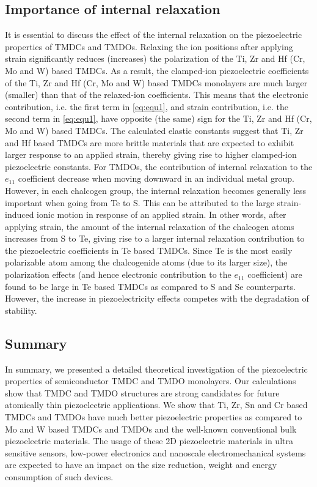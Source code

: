 \subsection{Importance of internal relaxation}

It is  essential to discuss the effect of the internal relaxation on the piezoelectric properties of TMDCs and TMDOs. Relaxing the ion positions after applying strain significantly reduces (increases) the polarization of the  Ti, Zr and Hf (Cr, Mo and W) based TMDCs. As a result, the clamped-ion piezoelectric coefficients of the Ti, Zr and Hf (Cr, Mo and W) based TMDCs monolayers are much larger (smaller) than that of the relaxed-ion coefficients. This means that the electronic contribution, i.e. the first term in \autoref{eq:equ1}, and strain contribution, i.e. the second term in \autoref{eq:equ1}, have opposite (the same) sign for the  Ti, Zr and Hf (Cr, Mo and W) based TMDCs.  The calculated elastic constants suggest that Ti, Zr and Hf based TMDCs are more brittle materials that are expected to exhibit larger response to an applied strain, thereby giving rise to higher clamped-ion piezoelectric constants.  For TMDOs, the contribution of internal relaxation to the $e_{11}$ coefficient decrease when moving downward in an individual metal group. 
However, in each chalcogen group, the internal relaxation becomes  generally less important when going from Te to S. This can be attributed to the large strain-induced ionic motion in response of an applied strain. 
In other words, after applying strain, the amount of the internal relaxation of the chalcogen atoms increases from S to Te, giving rise to a larger internal relaxation contribution to the piezoelectric coefficients in Te based TMDCs. 
Since Te is the most easily polarizable atom among the chalcogenide atoms (due to its larger size), the polarization effects (and hence electronic contribution to the  $e_{11}$ coefficient) are found to be large in Te based TMDCs  as compared to S and Se counterparts. However, the increase in piezoelectricity effects competes with the degradation of stability.

\subsection{Summary}

In summary, we presented a detailed theoretical investigation of the piezoelectric properties of semiconductor TMDC and TMDO monolayers. Our calculations show that TMDC and TMDO structures are strong candidates for future atomically thin piezoelectric applications.  We show that Ti,  Zr, Sn and Cr based TMDCs and TMDOs have much better piezoelectric properties as compared to Mo and W based 
TMDCs and TMDOs and the well-known conventional bulk piezoelectric materials.
The usage of these 2D piezoelectric materials in ultra sensitive sensors, low-power electronics and nanoscale electromechanical systems are expected to have an impact on the size reduction, weight and energy consumption of such devices. 

